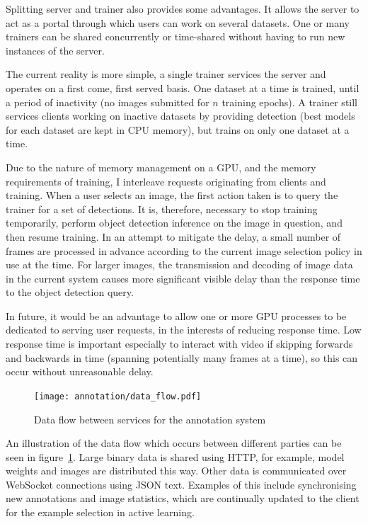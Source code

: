 Splitting server and trainer also provides some advantages. It allows the server to act as a portal through which users can work on several datasets. One or many trainers can be shared concurrently or time-shared without having to run new instances of the server. 

The current reality is more simple, a single trainer services the server and operates on a first come, first served basis. One dataset at a time is trained, until a period of inactivity (no images submitted for $ n $ training epochs). A trainer still services clients working on inactive datasets by providing detection (best models for each dataset are kept in \gls{CPU} memory), but trains on only one dataset at a time. 

Due to the nature of memory management on a \gls{GPU}, and the memory requirements of training, I interleave requests originating from clients and training. When a user selects an image, the first action taken is to query the trainer for a set of detections. It is, therefore, necessary to stop training temporarily, perform object detection inference on the image in question, and then resume training. In an attempt to mitigate the delay, a small number of frames are processed in advance according to the current image selection policy in use at the time. For larger images, the transmission and decoding of image data in the current system causes more significant visible delay than the response time to the object detection query.

In future, it would be an advantage to allow one or more \gls{GPU} processes to be dedicated to serving user requests, in the interests of reducing response time. Low response time is important especially to interact with video if skipping forwards and backwards in time (spanning potentially many frames at a time), so this can occur without unreasonable delay.

\begin{figure}[h!]
  \centering
  \texttt{[image: annotation/data\_flow.pdf]}
  \caption{Data flow between services for the annotation system}  
  \label{fig:data_flow}
\end{figure}

An illustration of the data flow which occurs between different parties can be seen in figure~\ref{fig:data_flow}. Large binary data is shared using \gls{HTTP}, for example, model weights and images are distributed this way. Other data is communicated over WebSocket connections using \gls{JSON} text. Examples of this include synchronising new annotations and image statistics, which are continually updated to the client for the example selection in active learning.

